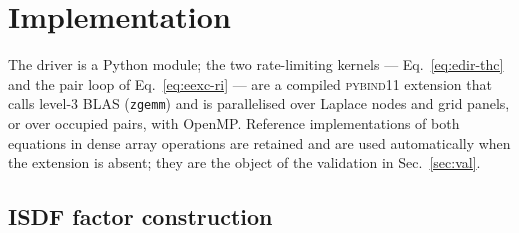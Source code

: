 \documentclass[aip,jcp,amsmath,amssymb,preprint,superscriptaddress]{revtex4-2}%
\begin{document}
\section{Implementation}
\label{sec:impl}

The driver is a Python module; the two rate-limiting kernels ---
Eq.~\eqref{eq:edir-thc} and the pair loop of Eq.~\eqref{eq:eexc-ri} --- are
a compiled \textsc{pybind11} extension that calls level-3 BLAS
(\texttt{zgemm}) and is parallelised over Laplace nodes and grid panels, or
over occupied pairs, with OpenMP. Reference implementations of both
equations in dense array operations are retained and are used automatically
when the extension is absent; they are the object of the validation in
Sec.~\ref{sec:val}.

\subsection{ISDF factor construction}
\end{document}
